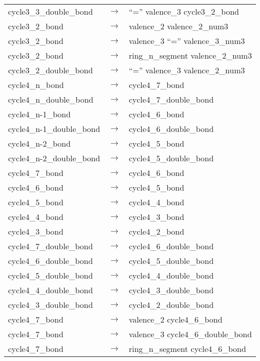 \begin{longtable}{m{} p{} p{}}
    cycle3\_3\_double\_bond & $\rightarrow$ & ``='' valence\_3 cycle3\_2\_bond \\
    cycle3\_2\_bond & $\rightarrow$ & valence\_2 valence\_2\_num3 \\
    cycle3\_2\_bond & $\rightarrow$ & valence\_3 ``='' valence\_3\_num3 \\
    cycle3\_2\_bond & $\rightarrow$ & ring\_n\_segment valence\_2\_num3 \\
    cycle3\_2\_double\_bond & $\rightarrow$ & ``='' valence\_3 valence\_2\_num3 \\
    cycle4\_n\_bond & $\rightarrow$ & cycle4\_7\_bond \\
    cycle4\_n\_double\_bond & $\rightarrow$ & cycle4\_7\_double\_bond \\
    cycle4\_n-1\_bond & $\rightarrow$ & cycle4\_6\_bond \\
    cycle4\_n-1\_double\_bond & $\rightarrow$ & cycle4\_6\_double\_bond \\
    cycle4\_n-2\_bond & $\rightarrow$ & cycle4\_5\_bond \\
    cycle4\_n-2\_double\_bond & $\rightarrow$ & cycle4\_5\_double\_bond \\
    cycle4\_7\_bond & $\rightarrow$ & cycle4\_6\_bond \\
    cycle4\_6\_bond & $\rightarrow$ & cycle4\_5\_bond \\
    cycle4\_5\_bond & $\rightarrow$ & cycle4\_4\_bond \\
    cycle4\_4\_bond & $\rightarrow$ & cycle4\_3\_bond \\
    cycle4\_3\_bond & $\rightarrow$ & cycle4\_2\_bond \\
    cycle4\_7\_double\_bond & $\rightarrow$ & cycle4\_6\_double\_bond \\
    cycle4\_6\_double\_bond & $\rightarrow$ & cycle4\_5\_double\_bond \\
    cycle4\_5\_double\_bond & $\rightarrow$ & cycle4\_4\_double\_bond \\
    cycle4\_4\_double\_bond & $\rightarrow$ & cycle4\_3\_double\_bond \\
    cycle4\_3\_double\_bond & $\rightarrow$ & cycle4\_2\_double\_bond \\
    cycle4\_7\_bond & $\rightarrow$ & valence\_2 cycle4\_6\_bond \\
    cycle4\_7\_bond & $\rightarrow$ & valence\_3 cycle4\_6\_double\_bond \\
    cycle4\_7\_bond & $\rightarrow$ & ring\_n\_segment cycle4\_6\_bond \\

\end{longtable}
